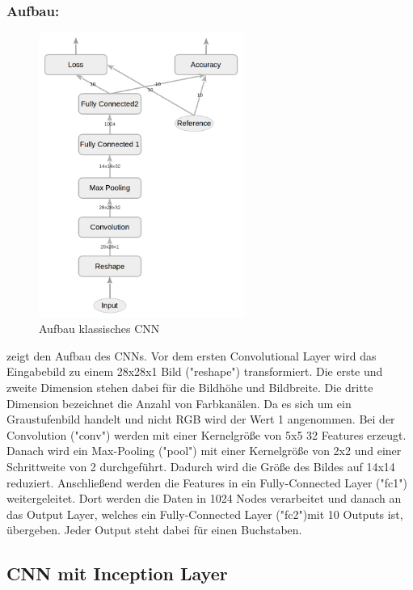 \documentclass[runningheads,a4paper]{llncs}[2015/06/24]
\begin{document}
\subsubsection*{Aufbau:}
\begin{figure}
	\centering
	\includegraphics[width=0.6\textwidth]{images/main_graph_conv_reduced.png}
	\caption{Aufbau klassisches CNN}
	\label{fig:main_graph_conv}
\end{figure}
 zeigt den Aufbau des CNNs. Vor dem ersten Convolutional Layer wird das Eingabebild zu einem 28x28x1 Bild ("reshape") transformiert. Die erste und zweite Dimension stehen dabei für die Bildhöhe und Bildbreite. Die dritte Dimension bezeichnet die Anzahl von Farbkanälen. Da es sich um ein Graustufenbild handelt und nicht RGB wird der Wert 1 angenommen. 
Bei der Convolution ("conv") werden mit einer Kernelgröße von 5x5 32 Features erzeugt. Danach wird ein Max-Pooling ("pool") mit einer Kernelgröße von 2x2 und einer Schrittweite von 2 durchgeführt. Dadurch wird die Größe des Bildes auf 14x14 reduziert. Anschließend werden die Features in ein Fully-Connected Layer ("fc1") weitergeleitet. Dort werden die Daten in 1024 Nodes verarbeitet und danach an das Output Layer, welches ein Fully-Connected Layer ("fc2")mit 10 Outputs ist, übergeben. Jeder Output steht dabei für einen Buchstaben.

\subsection{CNN mit Inception Layer}
\end{document}
